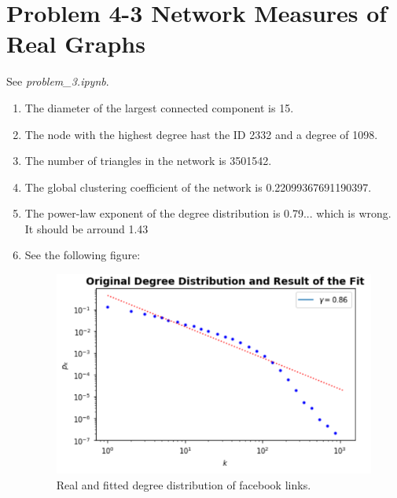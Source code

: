 \section{Problem 4-3 Network Measures of Real Graphs}

See \textit{problem\_3.ipynb}.

\begin{enumerate}
	\item The diameter of the largest connected component is 15.
	\item The node with the highest degree hast the ID 2332 and a degree of 1098.
	\item The number of triangles in the network is 3501542.
	\item The global clustering coefficient of the network is 0.22099367691190397.
	\item The power-law exponent of the degree distribution is 0.79...  which is wrong.  It should be arround 1.43
	\item See the following figure:
	
	\begin{figure}[h]
		\centering
		\includegraphics[width=0.9\linewidth]{images/problem43_degree_distribution.png}
		\caption{Real and fitted degree distribution of facebook links.}
		\label{distribution}
	\end{figure}
\end{enumerate}

